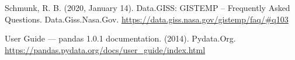 \documentclass[fontsize=11pt]{article}
\begin{document}
Schmunk, R. B. (2020, January 14). Data.GISS: GISTEMP -- Frequently Asked Questions. Data.Giss.Nasa.Gov. \url{https://data.giss.nasa.gov/gistemp/faq/#q103}

User Guide — pandas 1.0.1 documentation. (2014). Pydata.Org. \url{https://pandas.pydata.org/docs/user_guide/index.html}

\end{document}
